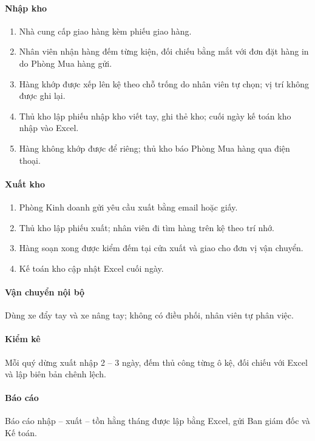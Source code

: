 \paragraph{Nhập kho}
\begin{enumerate}
  \item Nhà cung cấp giao hàng kèm phiếu giao hàng.
  \item Nhân viên nhận hàng đếm từng kiện, đối chiếu bằng mắt với đơn đặt hàng in do Phòng Mua hàng gửi.
  \item Hàng khớp được xếp lên kệ theo chỗ trống do nhân viên tự chọn; vị trí không được ghi lại.
  \item Thủ kho lập phiếu nhập kho viết tay, ghi thẻ kho; cuối ngày kế toán kho nhập vào Excel.
  \item Hàng không khớp được để riêng; thủ kho báo Phòng Mua hàng qua điện thoại.
\end{enumerate}

\paragraph{Xuất kho}
\begin{enumerate}
  \item Phòng Kinh doanh gửi yêu cầu xuất bằng email hoặc giấy.
  \item Thủ kho lập phiếu xuất; nhân viên đi tìm hàng trên kệ theo trí nhớ.
  \item Hàng soạn xong được kiểm đếm tại cửa xuất và giao cho đơn vị vận chuyển.
  \item Kế toán kho cập nhật Excel cuối ngày.
\end{enumerate}

\paragraph{Vận chuyển nội bộ} Dùng xe đẩy tay và xe nâng tay; không có điều phối, nhân viên tự phân việc.

\paragraph{Kiểm kê} Mỗi quý dừng xuất nhập 2 -- 3 ngày, đếm thủ công từng ô kệ, đối chiếu với Excel và lập biên bản chênh lệch.

\paragraph{Báo cáo} Báo cáo nhập -- xuất -- tồn hằng tháng được lập bằng Excel, gửi Ban giám đốc và Kế toán.

